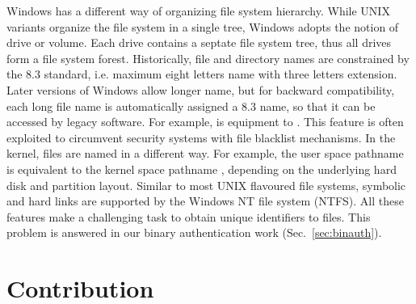 Windows has a different way of organizing file system hierarchy.
While UNIX variants organize the file system in a single tree,
Windows adopts the notion of drive or volume.
Each drive contains a septate file system tree, thus all drives
form a file system forest.
Historically, file and directory names are constrained by the 8.3
standard,
i.e. maximum eight letters name with three letters extension.
Later versions of Windows allow longer name, but for backward
compatibility, each long file name is automatically assigned a
8.3 name, so that it can be accessed by legacy software.
For example,  is equipment to .
This feature is often exploited to circumvent security systems with
file blacklist mechanisms.
In the kernel, files are named in a different way.
For example, the user space pathname 
is equivalent to the kernel space pathname
,
depending on the underlying hard disk and partition layout.
Similar to most UNIX flavoured file systems, symbolic and hard links
are supported by the Windows NT file system (NTFS).
All these features make a challenging task to obtain unique identifiers to files.
This problem is answered in our binary authentication work (Sec.~\ref{sec:binauth}).

\section{Contribution}


